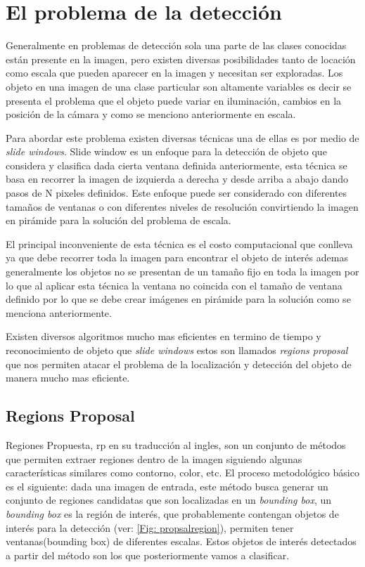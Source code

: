 \section{El problema de la detección}\label{sub:problema_deteccion}

Generalmente en problemas de detección sola una parte de las clases conocidas están presente en la imagen, pero existen diversas posibilidades tanto de locación como escala que pueden aparecer en la imagen y necesitan ser exploradas. Los objeto en una imagen de una clase particular son altamente variables es decir se presenta el problema que el objeto puede variar en iluminación, cambios en la posición de la cámara y como se menciono anteriormente en escala. 

Para abordar este problema existen diversas técnicas una de ellas es por medio de \textit{slide windows}. Slide window es un enfoque para la detección de objeto que considera y clasifica dada cierta ventana definida anteriormente, esta técnica se basa en recorrer la imagen de izquierda a derecha y desde arriba a abajo dando pasos de N pixeles definidos. Este enfoque puede ser considerado con diferentes tamaños de ventanas o con diferentes niveles de resolución convirtiendo la imagen en pirámide para la solución del problema de escala.

El principal inconveniente de esta técnica es el costo computacional que conlleva ya que debe recorrer toda la imagen para encontrar el objeto de interés ademas  generalmente los objetos no se presentan de un tamaño fijo en toda la imagen por lo que al aplicar esta técnica la ventana no coincida con el tamaño de ventana definido por lo que se debe crear imágenes en pirámide para la solución como se menciona anteriormente.

Existen diversos algoritmos mucho mas eficientes en termino de tiempo y reconocimiento de objeto que \textit{slide windows} estos son llamados  \textit{regions proposal} que nos permiten atacar el problema de la localización y detección del objeto de manera mucho mas eficiente.

\subsection{Regions Proposal} \label{sub:regions-proposal}

Regiones Propuesta, \ac{rp} en su traducción al ingles, son un conjunto de métodos que permiten extraer regiones dentro de la imagen siguiendo algunas características similares como contorno, color, etc. El proceso metodológico básico es el siguiente: dada una imagen de entrada, este método busca generar un conjunto de regiones candidatas que son localizadas en un \textit{bounding box}, un \textit{bounding box} es la región de interés, que probablemente contengan objetos de interés para la detección (ver: \ref{Fig: propsalregion}), permiten tener ventanas(bounding box) de diferentes escalas. Estos objetos de interés detectados a partir del método son los que posteriormente vamos a clasificar.

